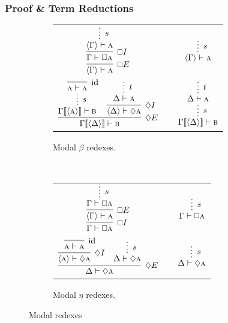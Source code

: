 \subsubsection{Proof \& Term Reductions}
\begin{figure}
	\begin{subfigure}{1\textwidth}
	\centering
		\begin{tabularx}{0.85\textwidth}{@{}ccc@{}}
		$\infer[\bx E]{\bracket{\Gamma} \vdash \prop{a}}{
			\infer[\bx I]{\Gamma \vdash \bx \prop{a}}{
				\infer*[s]{\bracket{\Gamma} \vdash  \prop{a}}{}
			}
		}
		$
		&
		\raisebox{10pt}{$\implies$}
		&
		$\infer*[s]{\bracket{\Gamma} \vdash \prop{a}}{}
		$\\[\smallsep]
		$\infer[\diamond E]{\Gamma\ctx{\bracket{\Delta}} \vdash \prop{b}}{
			\infer*[s]{\Gamma\ctx{\bracket{\prop{a}}} \vdash \prop{b}}{
				\infer[\Ax]{\prop{a} \vdash \prop{a}}{}}
			&
			\infer[\diamond I]{\bracket{\Delta} \vdash \diamond\prop{a}}{
				\infer*[t]{\Delta \vdash \prop{a}}{}
			}
		}
		$
		&
		\raisebox{20pt}{$\implies$}
		&
		$\infer*[s]{\Gamma\ctx{\bracket{\Delta}} \vdash \prop{b}}{
			\infer*[t]{\Delta \vdash \prop{a}}{}
		}
		$
		\end{tabularx}
		\caption{Modal $\beta$ redexes.}
		\label{subfigure:modal_beta_reductions}
	\end{subfigure}\\[\midsep]
	\begin{subfigure}{1\textwidth}
	\centering
		\begin{tabularx}{0.8\textwidth}{@{}ccc@{}}
			$\infer[\bx I]{\Gamma \vdash \bx\prop{a}}{
			\infer[\bx E]{\bracket{\Gamma} \vdash \prop{a}}{
					\infer*[s]{\Gamma \vdash  \bx\prop{a}}{}
				}
			}
			$
			&
			\raisebox{5pt}{$\equiv$}
			&
			$\infer*[s]{\Gamma \vdash \bx\prop{a}}{}
			$\\[\smallsep]
			$\infer[\diamond E]{\Delta \vdash \diamond\prop{a}}{
				\infer[\diamond I]{\bracket{\prop{a}}\vdash \diamond \prop{a}}{
					\infer[\Ax]{\prop{a} \vdash \prop{a}}{}
				}
				&
				\infer*[s]{\Delta \vdash \diamond\prop{a}}{}
			}$
			&
			\raisebox{15pt}{$\equiv$}
			&
			$\infer*[s]{\Delta \vdash \diamond \prop{a}}{}
			$
		\end{tabularx}
	\caption{Modal $\eta$ redexes.}
	\label{subfigure:modal_eta_reductions}
	\end{subfigure}
	\caption{Modal redexes}
	\label{figure:modal_reductions}
\end{figure}


